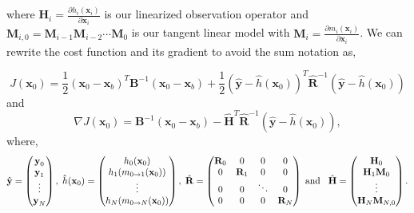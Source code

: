 \documentclass[11pt]{article}
\begin{document}
where $\textbf{H}_i = \frac{\partial h_i(\textbf{x}_i)}{\partial\textbf{x}_i}$ is our linearized observation operator and $\mathbf{M}_{i,0}=\mathbf{M}_{i-1}\mathbf{M}_{i-2}\cdots\mathbf{M}_0$ is our tangent linear model with $\mathbf{M}_i=\frac{\partial m_{i}(\textbf{x}_{i})}{\partial \textbf{x}_{i}}$. We can rewrite the cost function and its gradient to avoid the sum notation as,

\begin{equation}
J(\textbf{x}_0) = \frac{1}{2}(\textbf{x}_0-\textbf{x}_b)^{T}\textbf{B}^{-1}(\textbf{x}_0-\textbf{x}_b)+\frac{1}{2}(\hat{\textbf{y}}-\hat{h}(\textbf{x}_0))^{T}\hat{\textbf{R}}^{-1}(\hat{\textbf{y}}-\hat{h}(\textbf{x}_0)) \label{costfn}
\end{equation}
and
\begin{equation}
\nabla J(\textbf{x}_0) = \textbf{B}^{-1}(\textbf{x}_0-\textbf{x}_b)-\hat{\mathbf{H}}^{T}\hat{\textbf{R}}^{-1}(\hat{\textbf{y}}-\hat{h}(\textbf{x}_0)), \label{gradcostfn}
\end{equation}
where,
\begin{equation}
\hat{\textbf{y}}=
\begin{pmatrix}
\textbf{y}_0 \\
\textbf{y}_1\\
\vdots \\
\textbf{y}_N
\end{pmatrix},
\hspace{1mm}
\hat{h}(\textbf{x}_0)=
\begin{pmatrix}
h_0(\textbf{x}_0) \\
h_1(m_{0\rightarrow 1}(\mathbf{x}_{0}))\\
\vdots \\
h_N(m_{0\rightarrow N}(\mathbf{x}_{0}))
\end{pmatrix},
\hspace{1mm}
\hat{\mathbf{R}}=
\begin{pmatrix}
\mathbf{R}_0 & 0 & 0 & 0 \\
0 & \mathbf{R}_1 & 0 & 0 \\
0 & 0 & \ddots & 0 \\
0 & 0 & 0 & \mathbf{R}_N
\end{pmatrix}
\hspace{1mm} \text{and} \hspace{3mm}
\hat{\mathbf{H}}=
\begin{pmatrix}
\mathbf{H}_0 \\
\mathbf{H}_1\mathbf{M}_0\\
\vdots \\
\mathbf{H}_N\mathbf{M}_{N,0}
\end{pmatrix}.
\end{equation}
\end{document}
